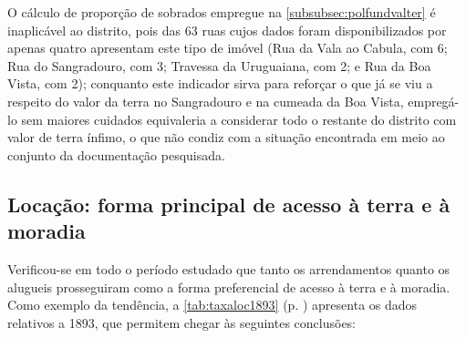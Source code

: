 O cálculo de proporção de sobrados empregue na \autoref{subsubsec:polfundvalter} é inaplicável ao distrito, pois das 63 ruas cujos dados foram disponibilizados por  apenas quatro apresentam este tipo de imóvel (Rua da Vala ao Cabula, com 6; Rua do Sangradouro, com 3; Travessa da Uruguaiana, com 2; e Rua da Boa Vista, com 2); conquanto este indicador sirva para reforçar o que já se viu a respeito do valor da terra no Sangradouro e na cumeada da Boa Vista, empregá-lo sem maiores cuidados equivaleria a considerar todo o restante do distrito com valor de terra ínfimo, o que não condiz com a situação encontrada em meio ao conjunto da documentação pesquisada. 

\subsection{Locação: forma principal de acesso à terra e à moradia}\label{subsec:locatermor}

Verificou-se em todo o período estudado que tanto os arrendamentos quanto os alugueis prosseguiram como a forma preferencial de acesso à terra e à moradia. Como exemplo da tendência, a \autoref{tab:taxaloc1893} (p. \pageref{tab:taxaloc1893}) apresenta os dados relativos a 1893, que permitem chegar às seguintes conclusões:

\afterpage{

}

